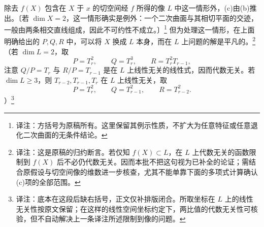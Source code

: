 \documentclass[openany]{ctexbook}
\newcommand{\note}[1]{\footnote{译注：#1}}
\begin{document}
除去 $f(X)$ 包含在 $X$ 于 $x$ 的切空间经 $f$ 所得的像 $L$ 中这一情形外，(c)由(b)推出。〔若 $\dim X=2$，这一情形确实是例外：一个二次曲面与其相切平面的交迹，一般由两条相交直线组成，因此不可约性不成立。〕\note{方括号为原稿所有。这里保留其例示性质，不扩大为任意特征或任意退化二次曲面的无条件结论。}
但为处理这一情形，在上面明确给出的 $P,Q,R$ 中，可以将 $X$ 换成 $L$ 本身，而在 $L$ 上问题的解是平凡的。\note{这是原稿的归约断言。若仅知 $f(X)\subset L$，在 $L$ 上代数无关的函数限制到 $f(X)$ 后不必仍代数无关。因而本批不把这句视为已补全的论证；需结合原假设与切空间像的维数进一步核查，尤其不能单靠下面的多项式计算确认(c)项的全部范围。}
（若 $\dim L=2$，取
\[
P=T_r^2,\qquad Q=T_r^3,\qquad R=T_r^2T_{r-1},
\]
注意 $Q/P=T_r$ 与 $R/P=T_{r-1}$ 是在 $L$ 上线性无关的线性式，因而代数无关。若 $\dim L\ge3$，则 $T_{r-2},T_{r-1},T_r$ 在 $L$ 上线性无关，取
\[
P=T_r^2,\qquad Q=T_{r-1}^2,\qquad R=T_{r-2}^2.
\]
）\note{底本在这段后缺右括号，正文仅补排版闭合。所取坐标在 $L$ 上的线性无关性按原文保留；在这样的线性空间坐标约定下，两比值的代数无关性可核验，但不自动解决上一条译注所述限制到像的问题。}
\end{document}
